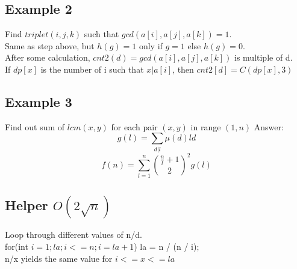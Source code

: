 	\subsection{Example 2}
	Find $triplet(i,j,k)$ such that $gcd(a[i], a[j], a[k])=1$. \\
	Same as step above, but $h(g) = 1$ only if $g=1$ else $h(g)=0$. \\
	After some calculation, $cnt2(d) = gcd(a[i], a[j], a[k])$ is multiple of d. \\
	If $dp[x]$ is the number of i such that $x | a[i]$, then $cnt2[d] = C(dp[x], 3)$

	\subsection{Example 3}
	Find out sum of $lcm(x,y)$ for each pair $(x,y)$ in range $(1,n)$
	Answer: 
	\[g(l) = \sum_{d|l} \mu(d)ld\]
	\[f(n)=\sum_{l=1}^{n}\binom{\frac{n}{l}+1}{2}^2g(l)\]
			
	\subsection{Helper $O(2\sqrt{n})$}
	Loop through different values of n/d. \\
	for(int $i = 1; la; i <= n; i = la+1$)  
	la = n / (n / i); \\
	n/x yields the same value for $i <= x <= la$
